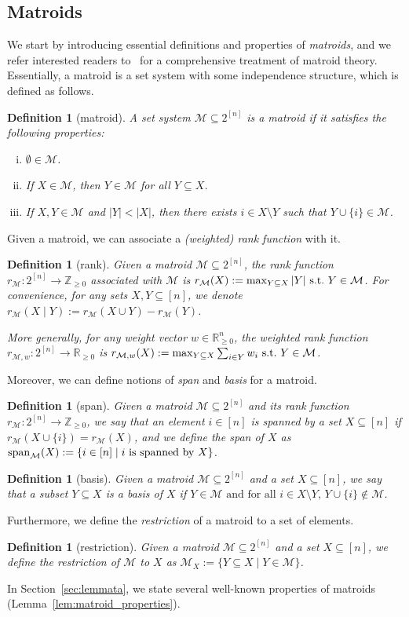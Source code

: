 \documentclass[11pt]{article}
\newcommand{\M}{{\mathcal M}}
\newcommand{\spa}{\textnormal{span}}
\newcommand{\Z}{{\mathbb Z}}
\newcommand{\R}{{\mathbb R}}
\newtheorem{definition}[theorem]{Definition}
\begin{document}
\subsection{Matroids}
We start by introducing essential definitions and properties of \emph{matroids}, and we refer interested readers to~\citet{welsh2010matroid} for a comprehensive treatment of matroid theory. Essentially, a matroid is a set system with some independence structure, which is defined as follows.
\begin{definition}[matroid]\label{def:matroid}
A set system $\M\subseteq 2^{[n]}$ is a matroid if it satisfies the following properties:
\begin{enumerate}[i.]
    \item $\emptyset\in\M$.
    \item If $X\in\M$, then $Y\in\M$ for all $Y\subseteq X$.
    \item If $X,Y\in\M$ and $|Y|<|X|$, then there exists $i\in X\setminus Y$ such that $Y\cup\{i\}\in\M$.
\end{enumerate}
\end{definition}
Given a matroid, we can associate a \emph{(weighted) rank function} with it.
\begin{definition}[rank]
Given a matroid $\M\subseteq 2^{[n]}$, the rank function $r_{\M}:2^{[n]}\to \Z_{\ge 0}$ associated with $\M$ is $r_{\M}(X):=\max_{Y\subseteq X} |Y| \textnormal{ s.t.~$Y\in\M$}$. For convenience, for any sets $X,Y\subseteq[n]$, we denote $r_{\M}(X\mid Y):=r_{\M}(X\cup Y)-r_{\M}(Y)$.

More generally, for any weight vector $w\in\R_{\ge0}^n$, the weighted rank function $r_{\M,w}:2^{[n]}\to \R_{\ge 0}$ is $r_{\M,w}(X):=\max_{Y\subseteq X}\sum_{i\in Y}w_i \textnormal{ s.t.~$Y\in\M$}$.
\end{definition}
Moreover, we can define notions of \emph{span} and \emph{basis} for a matroid.
\begin{definition}[span]
Given a matroid $\M\subseteq 2^{[n]}$ and its rank function $r_{\M}:2^{[n]}\to \Z_{\ge 0}$, we say that an element $i\in[n]$ is spanned by a set $X\subseteq [n]$ if $r_{\M}(X\cup\{i\})=r_{\M}(X)$, and we define the span of $X$ as $\spa_{\M}(X):=\{i\in[n]\mid i\textrm{ is spanned by $X$}\}$.
\end{definition}
\begin{definition}[basis]
Given a matroid $\M\subseteq 2^{[n]}$ and a set $X\subseteq [n]$, we say that a subset $Y\subseteq X$ is a basis of $X$ if
$Y\in\M \textrm{ and for all } i\in X\setminus Y,\,Y\cup\{i\}\notin\M$.
\end{definition}
Furthermore, we define the \emph{restriction} of a matroid to a set of elements.
\begin{definition}[restriction]
Given a matroid $\M\subseteq 2^{[n]}$ and a set $X\subseteq [n]$, we define the restriction of $\M$ to $X$ as $\M_X:=\{Y\subseteq X\mid Y\in \M\}$.
\end{definition}
In Section~\ref{sec:lemmata}, we state several well-known properties of matroids (Lemma~\ref{lem:matroid_properties}).
\end{document}
